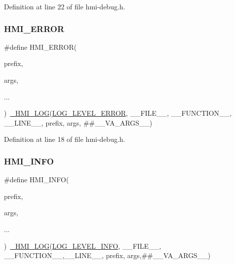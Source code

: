Definition at line 22 of file hmi-\/debug.\+h.

\mbox{\label{hmi-debug_8h_a65bb6c7cfe38f8a724beab5059d36fb2}} 
\subsubsection{\texorpdfstring{H\+M\+I\+\_\+\+E\+R\+R\+OR}{HMI\_ERROR}}
{\footnotesize\ttfamily \#define H\+M\+I\+\_\+\+E\+R\+R\+OR(\begin{DoxyParamCaption}\item[{}]{prefix,  }\item[{}]{args,  }\item[{}]{... }\end{DoxyParamCaption})~\hyperlink{hmi-debug_8h_a0846b9d51e2e0612c4825a9a581aa40a}{\+\_\+\+H\+M\+I\+\_\+\+L\+OG}(\hyperlink{hmi-debug_8h_aa5a9053636a30269210c54e734e0d583a5b40f003febbc3b535649d63f4b8a44f}{L\+O\+G\+\_\+\+L\+E\+V\+E\+L\+\_\+\+E\+R\+R\+OR}, \+\_\+\+\_\+\+F\+I\+L\+E\+\_\+\+\_\+, \+\_\+\+\_\+\+F\+U\+N\+C\+T\+I\+O\+N\+\_\+\+\_\+, \+\_\+\+\_\+\+L\+I\+N\+E\+\_\+\+\_\+, prefix, args, \#\#\+\_\+\+\_\+\+V\+A\+\_\+\+A\+R\+G\+S\+\_\+\+\_\+)}



Definition at line 18 of file hmi-\/debug.\+h.

\mbox{\label{hmi-debug_8h_a11b249a67108f0f4c50a0fc8a3eb4f5c}} 
\subsubsection{\texorpdfstring{H\+M\+I\+\_\+\+I\+N\+FO}{HMI\_INFO}}
{\footnotesize\ttfamily \#define H\+M\+I\+\_\+\+I\+N\+FO(\begin{DoxyParamCaption}\item[{}]{prefix,  }\item[{}]{args,  }\item[{}]{... }\end{DoxyParamCaption})~\hyperlink{hmi-debug_8h_a0846b9d51e2e0612c4825a9a581aa40a}{\+\_\+\+H\+M\+I\+\_\+\+L\+OG}(\hyperlink{hmi-debug_8h_aa5a9053636a30269210c54e734e0d583aedee1e3159bfe7d918b6e29873c5aee4}{L\+O\+G\+\_\+\+L\+E\+V\+E\+L\+\_\+\+I\+N\+FO}, \+\_\+\+\_\+\+F\+I\+L\+E\+\_\+\+\_\+, \+\_\+\+\_\+\+F\+U\+N\+C\+T\+I\+O\+N\+\_\+\+\_\+,\+\_\+\+\_\+\+L\+I\+N\+E\+\_\+\+\_\+, prefix, args,\#\#\+\_\+\+\_\+\+V\+A\+\_\+\+A\+R\+G\+S\+\_\+\+\_\+)}



